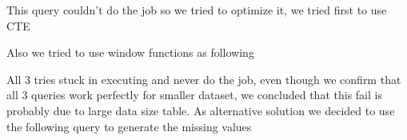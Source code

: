 This query couldn't do the job so we tried to optimize it, we tried first to use CTE
\begin{figure}[H]
\centering
{}
\end{figure}

Also we tried to use window functions as following
\begin{figure}[H]
\centering
{}
\end{figure}

All 3 tries stuck in executing and never do the job, even though we confirm that all 3 queries work perfectly for smaller dataset,  we concluded that this fail is probably due to large data size table. 
\vskip0.2cm
As alternative solution we decided to use the following query to generate the missing values
\begin{figure}[H]
\centering
{}
\end{figure}

